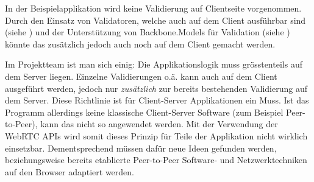 In der Beispielapplikation wird keine Validierung auf Clientseite vorgenommen. Durch den Einsatz von Validatoren, welche auch auf dem Client ausführbar sind (siehe \cite{nodevalidator}) und der Unterstützung von Backbone.Models für Validation (siehe \cite{BackboneModelValidation}) könnte das zusätzlich jedoch auch noch auf dem Client gemacht werden.

Im Projektteam ist man sich einig: Die Applikationslogik muss grösstenteils auf dem Server liegen. Einzelne Validierungen o.ä. kann auch auf dem Client ausgeführt werden, jedoch nur \emph{zusätzlich} zur bereits bestehenden Validierung auf dem Server.
Diese Richtlinie ist für Client-Server Applikationen ein Muss. Ist das Programm allerdings keine klassische Client-Server Software (zum Beispiel Peer-to-Peer), kann das nicht so angewendet werden.
Mit der Verwendung der \gls{WebRTC} APIs wird somit dieses Prinzip für Teile der Applikation nicht wirklich einsetzbar. Dementsprechend müssen dafür neue Ideen gefunden werden, beziehungsweise bereits etablierte Peer-to-Peer Software- und Netzwerktechniken auf den Browser adaptiert werden.